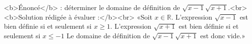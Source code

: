 <b>Énoncé</b> : déterminer le domaine de définition de $\sqrt{x-1}\sqrt{x+1}$.<br> <b>Solution rédigée à évaluer :</b><br>  «Soit $x\in\mathbb{R}$.  L'expression $\sqrt{x-1}$ est bien définie si et seulement si $x\geq 1$. L'expression $\sqrt{x+1}$ est bien définie si et seulement si $x\leq -1$ Le domaine de définition de $\sqrt{x-1}\sqrt{x+1}$ est donc vide.»

\begin{reponses}
\end{reponses}

\begin{comment}
Erreur sur le domaine de la deuxième racine.
\end{comment}

